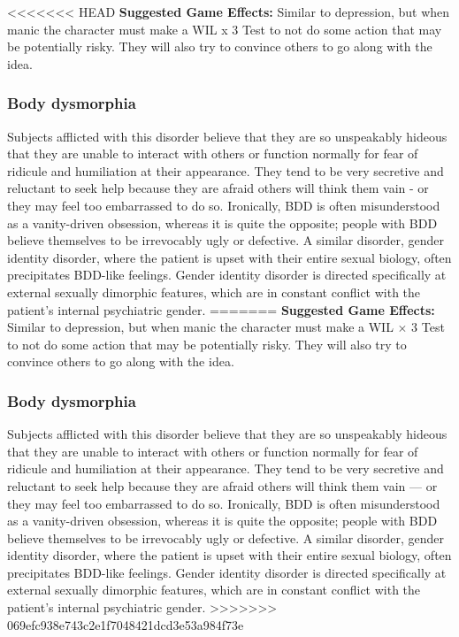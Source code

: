 <<<<<<< HEAD
\textbf{Suggested Game Effects:} Similar to depression, but when manic the character must make a WIL x 3 Test to not do some action that may be potentially risky. They will also try to convince others to go along with the idea.

\subsubsection{Body dysmorphia}

Subjects afflicted with this disorder believe that they are so unspeakably hideous that they are unable to interact with others or function normally for fear of ridicule and humiliation at their appearance. They tend to be very secretive and reluctant to seek help because they are afraid others will think them vain -  or they may feel too embarrassed to do so. Ironically, BDD is often misunderstood as a vanity-driven obsession, whereas it is quite the opposite; people with BDD believe themselves to be irrevocably ugly or defective. A similar disorder, gender identity disorder, where the patient is upset with their entire sexual biology, often precipitates BDD-like feelings. Gender identity disorder is directed specifically at external sexually dimorphic features, which are in constant conflict with the patient’s internal psychiatric gender.
=======
\textbf{Suggested Game Effects:} Similar to depression, but when manic the character must make a WIL $\times$ 3 Test to not do some action that may be potentially risky. They will also try to convince others to go along with the idea.

\subsubsection{Body dysmorphia}

Subjects afflicted with this disorder believe that they are so unspeakably hideous that they are unable to interact with others or function normally for fear of ridicule and humiliation at their appearance. They tend to be very secretive and reluctant to seek help because they are afraid others will think them vain ---  or they may feel too embarrassed to do so. Ironically, BDD is often misunderstood as a vanity-driven obsession, whereas it is quite the opposite; people with BDD believe themselves to be irrevocably ugly or defective. A similar disorder, gender identity disorder, where the patient is upset with their entire sexual biology, often precipitates BDD-like feelings. Gender identity disorder is directed specifically at external sexually dimorphic features, which are in constant conflict with the patient’s internal psychiatric gender.
>>>>>>> 069efc938e743c2e1f7048421dcd3e53a984f73e

